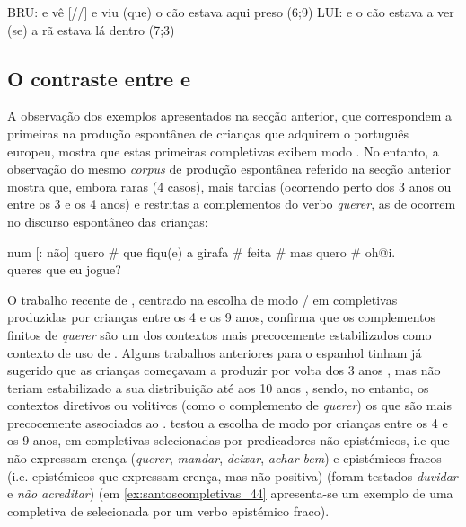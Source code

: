 \documentclass[output=paper]{LSP/langsci}
\begin{document}
\ea\label{ex:santoscompletivas_42}
\ea\label{ex:santoscompletivas_42a} BRU: e vê [//] e viu (que) o cão estava aqui preso (6;9)
\ex\label{ex:santoscompletivas_42b} LUI: e o cão estava a ver (se) a rã estava lá dentro (7;3)\\
\zl

\subsection{O contraste entre  e }
\label{subsec:santoscompletivas_contraste}

A observação dos exemplos apresentados na secção anterior, que correspondem a primeiras  na produção espontânea de crianças que adquirem o português europeu, mostra que estas primeiras completivas exibem modo . No entanto, a observação do mesmo \textit{corpus} de produção espontânea referido na secção anterior mostra que, embora raras (4 casos), mais tardias (ocorrendo perto dos 3 anos ou entre os 3 e os 4 anos) e restritas a complementos do verbo \textit{querer}, as  de  ocorrem no discurso espontâneo das crianças:

\ea\label{ex:santoscompletivas_43}
\ea\label{ex:santoscompletivas_43a} num [: não] quero \# que fiqu(e) a girafa \# feita \# mas quero \# oh@i.\\
\ex\label{ex:santoscompletivas_43b} queres que eu jogue?
\zl

O trabalho recente de \citet{jesus2014}, centrado na escolha de modo  /  em completivas produzidas por crianças entre os 4 e os 9 anos, confirma que os complementos finitos de \textit{querer} são um dos contextos mais precocemente estabilizados como contexto de uso de . Alguns trabalhos anteriores para o espanhol tinham já sugerido que as crianças começavam a produzir  por volta dos 3 anos \citep{giligaya1972}, mas não teriam estabilizado a sua distribuição até aos 10 anos \citep{blake1983}, sendo, no entanto, os contextos diretivos ou volitivos (como o complemento de \textit{querer}) os que são mais precocemente associados ao  \citep{giligaya1972,blake1983}. \citet{jesus2014} testou a escolha de modo  por crianças entre os 4 e os 9 anos, em completivas selecionadas por predicadores não epistémicos, i.e que não expressam crença (\textit{querer}, \textit{mandar}, \textit{deixar}, \textit{achar bem}) e epistémicos fracos (i.e. epistémicos que expressam crença, mas não positiva) (foram testados \textit{duvidar} e \textit{não acreditar}) (em \ref{ex:santoscompletivas_44} apresenta-se um exemplo de uma completiva de  selecionada por um verbo epistémico fraco).
\end{document}

